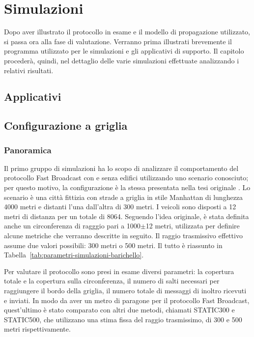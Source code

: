 %
\chapter{Simulazioni}
Dopo aver illustrato il protocollo in esame e il modello di propagazione utilizzato, si passa ora alla fase di valutazione.
Verranno prima illustrati brevemente il programma utilizzato per le simulazioni e gli applicativi di supporto.
Il capitolo procederà, quindi, nel dettaglio delle varie simulazioni effettuate analizzando i relativi risultati.
%
\section{Applicativi}
%
\section{Configurazione a griglia}
\subsection{Panoramica}
Il primo gruppo di simulazioni ha lo scopo di analizzare il comportamento del protocollo Fast Broadcast con e senza edifici utilizzando uno scenario conosciuto;
per questo motivo, la configurazione è la stessa presentata nella tesi originale \cite{Barichello2017propagazione}.
Lo scenario è una città fittizia con strade a griglia in stile Manhattan di lunghezza 4000 metri e distanti l'una dall'altra di 300 metri.
I veicoli sono disposti a 12 metri di distanza per un totale di 8064.
Seguendo l'idea originale, è stata definita anche un circonferenza di ragggio pari a 1000$\pm$12 metri, utilizzata per definire alcune metriche che verranno descritte in seguito.
Il raggio trasmissivo effettivo assume due valori possibili: 300 metri o 500 metri.
Il tutto è riassunto in Tabella~\ref{tab:parametri-simulazioni-barichello}.

Per valutare il protocollo sono presi in esame diversi parametri: la copertura totale e la copertura sulla circonferenza,
il numero di salti necessari per raggiungere il bordo della griglia, il numero totale di messaggi di inoltro ricevuti e inviati.
In modo da aver un metro di paragone per il protocollo Fast Broadcast, quest'ultimo è stato comparato con altri due metodi, chiamati STATIC300 e STATIC500,
che utilizzano una stima fissa del raggio trasmissimo, di 300 e 500 metri rispettivamente.

